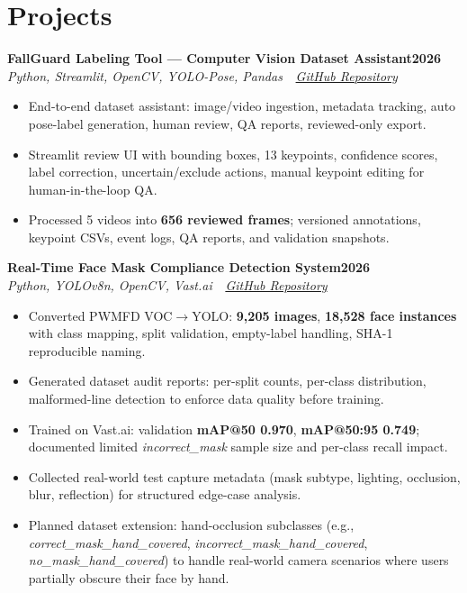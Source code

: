 \documentclass[10pt, a4paper]{article}
\newenvironment{cvitems}{%
    \begin{itemize}[leftmargin=1.4em, itemsep=0pt, topsep=1pt, parsep=0pt]
}{%
    \end{itemize}
}
\newcommand{\entryhead}[2]{%
    \noindent\textbf{#1}\hfill\textbf{#2}\\[-2pt]
}
\newcommand{\entrysub}[1]{%
    \noindent\textit{#1}\\[1pt]
}
\begin{document}
\section{Projects}

\entryhead{FallGuard Labeling Tool --- Computer Vision Dataset Assistant}{2026}
\entrysub{Python, Streamlit, OpenCV, YOLO-Pose, Pandas \,\textbullet\,
  \href{https://github.com/NguyenKhacBao564}{GitHub Repository}}
\begin{cvitems}
    \item End-to-end dataset assistant: image/video ingestion, metadata tracking, auto pose-label generation, human review, QA reports, reviewed-only export.
    \item Streamlit review UI with bounding boxes, 13 keypoints, confidence scores, label correction, uncertain/exclude actions, manual keypoint editing for human-in-the-loop QA.
    \item Processed 5 videos into \textbf{656 reviewed frames}; versioned annotations, keypoint CSVs, event logs, QA reports, and validation snapshots.
\end{cvitems}

\vspace{3pt}

\entryhead{Real-Time Face Mask Compliance Detection System}{2026}
\entrysub{Python, YOLOv8n, OpenCV, Vast.ai \,\textbullet\,
  \href{https://github.com/NguyenKhacBao564/Real-Time-Face-Mask-Compliance-Detection-System}{GitHub Repository}}
\begin{cvitems}
    \item Converted PWMFD VOC$\rightarrow$YOLO: \textbf{9,205 images}, \textbf{18,528 face instances} with class mapping, split validation, empty-label handling, SHA-1 reproducible naming.
    \item Generated dataset audit reports: per-split counts, per-class distribution, malformed-line detection to enforce data quality before training.
    \item Trained on Vast.ai: validation \textbf{mAP@50 0.970}, \textbf{mAP@50:95 0.749}; documented limited \textit{incorrect\_mask} sample size and per-class recall impact.
    \item Collected real-world test capture metadata (mask subtype, lighting, occlusion, blur, reflection) for structured edge-case analysis.
    \item Planned dataset extension: hand-occlusion subclasses (e.g., \textit{correct\_mask\_hand\_covered}, \textit{incorrect\_mask\_hand\_covered}, \textit{no\_mask\_hand\_covered}) to handle real-world camera scenarios where users partially obscure their face by hand.
\end{cvitems}
\end{document}
